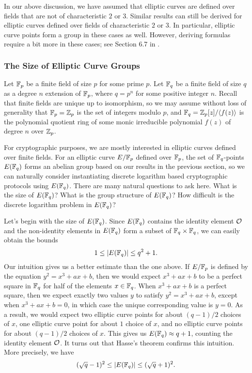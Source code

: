 \begin{remark}
    In our above discussion, we have assumed that elliptic curves are 
    defined over fields that are not of characteristic $2$ or $3$. Similar 
    results can still be derived for elliptic curves defined over fields 
    of characteristic $2$ or $3$. In particular, elliptic curve points form 
    a group in these cases as well. However, deriving formulas require a 
    bit more in these cases; see Section 6.7 in \cite{10.5555/1481183}. 
\end{remark}

\subsubsection{The Size of Elliptic Curve Groups}
Let $\mathbb{F}_p$ be a finite field of size $p$ for some prime $p$. Let $\mathbb{F}_q$ 
be a finite field of size $q$ as a degree $n$ extension of $\mathbb{F}_p$, where 
$q = p^n$ for some positive integer $n$. Recall that finite fields are 
unique up to isomorphism, so we may assume without loss of generality that 
$\mathbb{F}_p = \mathbb{Z}_p$ is the set of integers modulo $p$, and $\mathbb{F}_q = 
\mathbb{Z}_p[z]/\langle f(z) \rangle$ is the polynomial quotient ring of some 
monic irreducible polynomial $f(z)$ of degree $n$ over $\mathbb{Z}_p$. 

For cryptographic purposes, we are mostly interested in elliptic curves 
defined over finite fields. For an elliptic curve $E/\mathbb{F}_p$ defined over 
$\mathbb{F}_p$, the set of $\mathbb{F}_q$-points $E(\mathbb{F}_q)$ forms an abelian group based 
on our results in the previous section, so we can naturally consider 
instantiating discrete logarithm based cryptographic protocols using $E(\mathbb{F}_q)$.
There are many natural questions to ask here. What is the size of 
$E(\mathbb{F}_q)$? What is the group structure of $E(\mathbb{F}_q)$? How difficult is the 
discrete logarithm problem in $E(\mathbb{F}_q)$? 

Let's begin with the size of $E(\mathbb{F}_q)$. Since $E(\mathbb{F}_q)$ contains the 
identity element ${\cal O}$ and the non-identity elements in $E(\mathbb{F}_q)$ 
form a subset of $\mathbb{F}_q \times \mathbb{F}_q$, we can easily obtain the bounds 
\[ 1 \leq |E(\mathbb{F}_q)| \leq q^2 + 1. \] 
Our intuition gives us a better estimate than the one above. If $E/\mathbb{F}_p$ 
is defined by the equation $y^2 = x^3 + ax + b$, then we would expect 
$x^3 + ax + b$ to be a perfect square in $\mathbb{F}_q$ for half of the elements 
$x \in \mathbb{F}_q$. When $x^3 + ax + b$ is a perfect square, then we expect 
exactly two values $y$ to satisfy $y^2 = x^3 + ax + b$, except when 
$x^3 + ax + b = 0$, in which case the unique corresponding value is $y = 0$. 
As a result, we would expect two elliptic curve points for about 
$(q - 1)/2$ choices of $x$, one elliptic curve point for about $1$ choice of $x$,
and no elliptic curve points for about $(q - 1)/2$ choices of $x$. This gives us 
$E(\mathbb{F}_q) \approx q + 1$, counting the identity element ${\cal O}$. It turns 
out that Hasse's theorem confirms this intuition. More precisely, we have 
\[ (\sqrt q - 1)^2 \leq |E(\mathbb{F}_q)| \leq (\sqrt q + 1)^2. \] 
